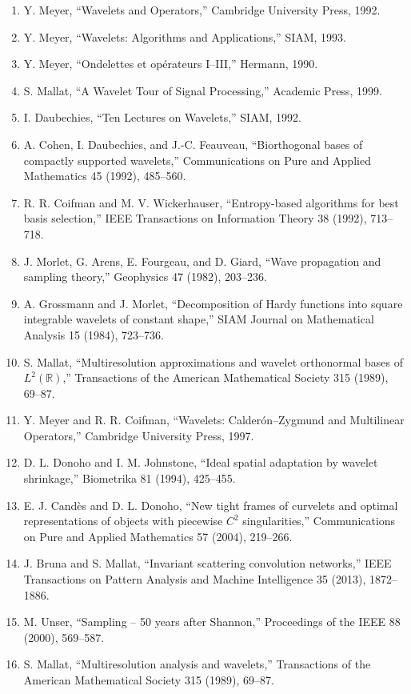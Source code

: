 \begin{enumerate}
\item Y. Meyer, ``Wavelets and Operators,'' Cambridge University Press, 1992.
\item Y. Meyer, ``Wavelets: Algorithms and Applications,'' SIAM, 1993.
\item Y. Meyer, ``Ondelettes et op\'erateurs I--III,'' Hermann, 1990.
\item S. Mallat, ``A Wavelet Tour of Signal Processing,'' Academic Press, 1999.
\item I. Daubechies, ``Ten Lectures on Wavelets,'' SIAM, 1992.
\item A. Cohen, I. Daubechies, and J.-C. Feauveau, ``Biorthogonal bases of compactly supported wavelets,'' Communications on Pure and Applied Mathematics 45 (1992), 485--560.
\item R. R. Coifman and M. V. Wickerhauser, ``Entropy-based algorithms for best basis selection,'' IEEE Transactions on Information Theory 38 (1992), 713--718.
\item J. Morlet, G. Arens, E. Fourgeau, and D. Giard, ``Wave propagation and sampling theory,'' Geophysics 47 (1982), 203--236.
\item A. Grossmann and J. Morlet, ``Decomposition of Hardy functions into square integrable wavelets of constant shape,'' SIAM Journal on Mathematical Analysis 15 (1984), 723--736.
\item S. Mallat, ``Multiresolution approximations and wavelet orthonormal bases of $L^2(\mathbb{R})$,'' Transactions of the American Mathematical Society 315 (1989), 69--87.
\item Y. Meyer and R. R. Coifman, ``Wavelets: Calder\'on--Zygmund and Multilinear Operators,'' Cambridge University Press, 1997.
\item D. L. Donoho and I. M. Johnstone, ``Ideal spatial adaptation by wavelet shrinkage,'' Biometrika 81 (1994), 425--455.
\item E. J. Cand\`es and D. L. Donoho, ``New tight frames of curvelets and optimal representations of objects with piecewise $C^2$ singularities,'' Communications on Pure and Applied Mathematics 57 (2004), 219--266.
\item J. Bruna and S. Mallat, ``Invariant scattering convolution networks,'' IEEE Transactions on Pattern Analysis and Machine Intelligence 35 (2013), 1872--1886.
\item M. Unser, ``Sampling -- 50 years after Shannon,'' Proceedings of the IEEE 88 (2000), 569--587.
\item S. Mallat, ``Multiresolution analysis and wavelets,'' Transactions of the American Mathematical Society 315 (1989), 69--87.

\end{enumerate}
